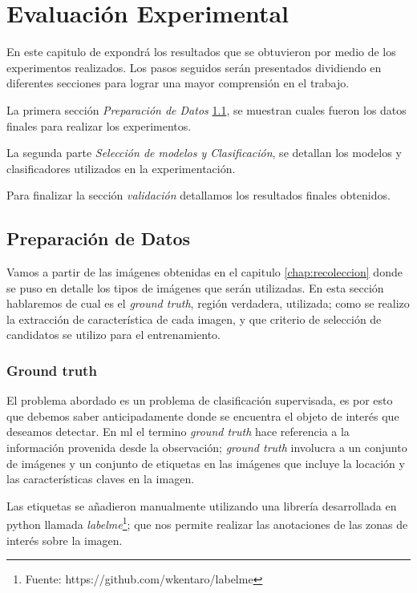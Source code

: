 \chapter{Evaluación Experimental}\label{chap:evaluacion}

En este capitulo de expondrá los resultados que se obtuvieron por medio de los experimentos realizados. Los pasos seguidos serán presentados dividiendo en diferentes secciones para lograr una mayor comprensión en el trabajo.

La primera sección \textit{Preparación de Datos} \ref{sec:preparacion_de_datos}, se muestran cuales fueron los datos finales para realizar los experimentos.

La segunda parte  \textit{Selección de modelos y Clasificación}, se detallan los modelos y clasificadores utilizados en la experimentación.

Para finalizar  la sección \textit{validación} detallamos los resultados finales obtenidos.


\section{Preparación de Datos}\label{sec:preparacion_de_datos}

Vamos a partir de las imágenes obtenidas en el capitulo \ref{chap:recoleccion} donde se puso en detalle los tipos de imágenes que serán utilizadas. En esta sección hablaremos de cual es el \textit{ground truth}, región verdadera, utilizada; como se realizo la extracción de característica de cada imagen, y que criterio de selección de candidatos se utilizo para el entrenamiento.

\subsection{Ground truth}\label{sub:groundtruth}

El problema abordado es un problema de clasificación supervisada, es por esto que debemos saber anticipadamente donde se encuentra el objeto de interés que deseamos detectar. En \ac{ml} el termino \textit{ground truth} hace referencia a la información provenida desde la observación; \textit{ground truth} involucra a un conjunto de imágenes y un conjunto de etiquetas en las imágenes que incluye la locación y las características claves en la imagen.

Las etiquetas se añadieron manualmente utilizando una librería desarrollada en python llamada \textit{labelme}\footnote{Fuente: 
https://github.com/wkentaro/labelme}; que nos permite realizar las anotaciones de las zonas de interés sobre la imagen.

